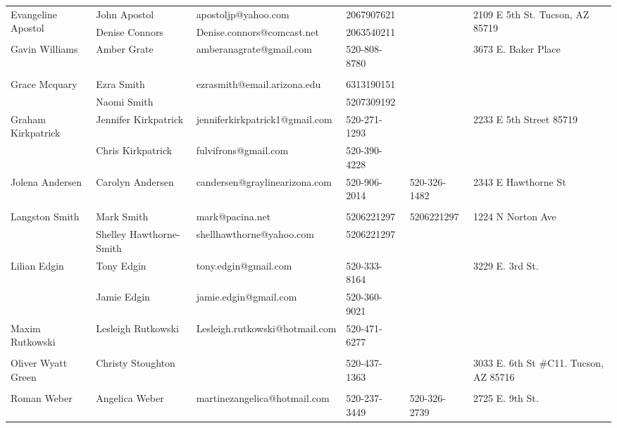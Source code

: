 \documentclass[landscape]{article}\usepackage[]{graphicx}\usepackage[]{color}
\begin{document}
\begin{longtable}{|p{100pt}|p{100pt}|p{140pt}|p{60pt}|p{64pt}|p{120pt}|}
\hline
\multirow{2}{100pt}{Evangeline Apostol} & John Apostol & apostoljp@yahoo.com & 2067907621 &  & \multirow{2}{120pt}{2109 E 5th St. Tucson, AZ 85719} \\
 & Denise Connors & Denise.connors@comcast.net & 2063540211 &  & \\
\hline
\multirow{2}{100pt}{Gavin Williams} & Amber Grate & amberanagrate@gmail.com & 520-808-8780 &  & \multirow{2}{120pt}{3673 E. Baker Place} \\
 &  &  &  &  & \\
\hline
\multirow{2}{100pt}{Grace Mcquary} & Ezra Smith & ezrasmith@email.arizona.edu & 6313190151 &  & \multirow{2}{120pt}{} \\
 & Naomi Smith &  & 5207309192 &  & \\
\hline
\multirow{2}{100pt}{Graham Kirkpatrick} & Jennifer Kirkpatrick & jenniferkirkpatrick1@gmail.com & 520-271-1293 &  & \multirow{2}{120pt}{2233 E 5th Street 85719} \\
 & Chris Kirkpatrick & fulvifrons@gmail.com & 520-390-4228 &  & \\
\hline
\multirow{2}{100pt}{Jolena Andersen} & Carolyn Andersen & candersen@graylinearizona.com & 520-906-2014 & 520-326-1482 & \multirow{2}{120pt}{2343 E Hawthorne St} \\
 &  &  &  &  & \\
\hline
\multirow{2}{100pt}{Langston Smith} & Mark Smith & mark@pacina.net & 5206221297 & 5206221297 & \multirow{2}{120pt}{1224 N Norton Ave} \\
 & Shelley Hawthorne-Smith & shellhawthorne@yahoo.com & 5206221297 &  & \\
\hline
\multirow{2}{100pt}{Lilian Edgin} & Tony Edgin & tony.edgin@gmail.com & 520-333-8164 &  & \multirow{2}{120pt}{3229 E. 3rd St.} \\
 & Jamie Edgin & jamie.edgin@gmail.com & 520-360-9021 &  & \\
\hline
\multirow{2}{100pt}{Maxim Rutkowski} & Lesleigh Rutkowski  & Lesleigh.rutkowski@hotmail.com & 520-471-6277 &  & \multirow{2}{120pt}{} \\
 &  &  &  &  & \\
\hline
\multirow{2}{100pt}{Oliver Wyatt Green} & Christy Stoughton &  & 520-437-1363 &  & \multirow{2}{120pt}{3033 E. 6th St \#C11. Tucson, AZ 85716} \\
 &  &  &  &  & \\
\hline
\multirow{2}{100pt}{Roman Weber} & Angelica Weber & martinezangelica@hotmail.com & 520-237-3449 & 520-326-2739 & \multirow{2}{120pt}{2725 E. 9th St.} \\

\end{longtable}
\end{document}
